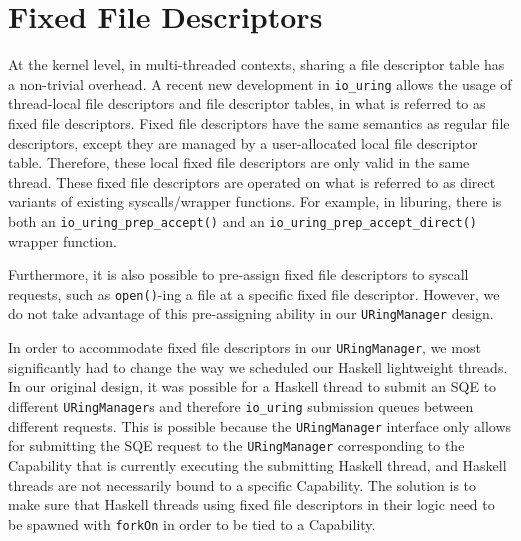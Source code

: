 
\section{Fixed File Descriptors}

At the kernel level,  in multi-threaded contexts, sharing a file descriptor table has a non-trivial overhead.
A recent new development in \texttt{io\_uring} allows the usage of thread-local file descriptors and file descriptor tables, in what is referred to as fixed file descriptors.
Fixed file descriptors have the same semantics as regular file descriptors, except they are managed by a user-allocated local file descriptor table.
Therefore, these local fixed file descriptors are only valid in the same thread.
These fixed file descriptors are operated on what is referred to as direct variants of existing syscalls/wrapper functions.
For example, in liburing, there is both an \texttt{io\_uring\_prep\_accept()} and an \texttt{io\_uring\_prep\_accept\_direct()} wrapper function.

Furthermore, it is also possible to pre-assign fixed file descriptors
to syscall requests, such as \texttt{open()}-ing a file at a specific fixed file descriptor.
However, we do not take advantage of this pre-assigning ability in our \texttt{URingManager} design.

In order to accommodate fixed file descriptors in our \texttt{URingManager}, we most significantly had to change
the way we scheduled our Haskell lightweight threads.
In our original design, it was possible for a Haskell thread to submit an SQE to different
\texttt{URingManager}s and therefore \texttt{io\_uring} submission queues between different requests.
This is possible because the \texttt{URingManager} interface only allows for submitting the SQE request
to the \texttt{URingManager} corresponding to the Capability that is currently executing the submitting Haskell thread,
and Haskell threads are not necessarily bound to a specific Capability.
The solution is to make sure that Haskell threads using fixed file descriptors in their
logic need to be spawned with \texttt{forkOn} in order to be tied to a Capability.


